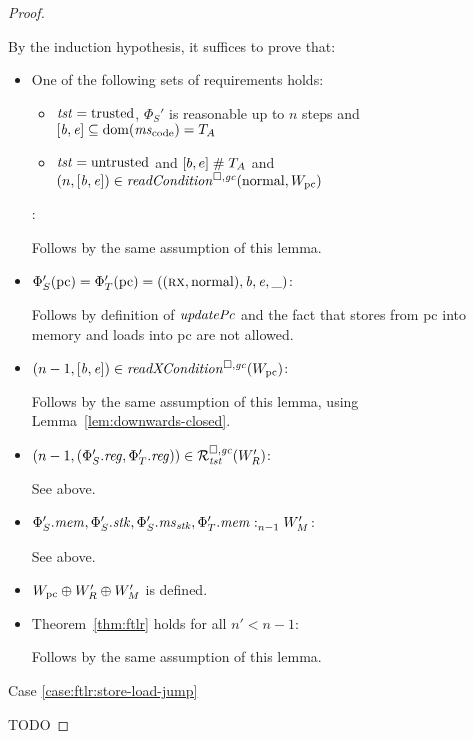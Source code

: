 \begin{proof}
\begin{itemize}
  \end{itemize}

  By the induction hypothesis, it suffices to prove that:
  \begin{itemize}
  \item One of the following sets of requirements holds:
    \begin{itemize}
    \item $\trust = \trusted$, $\Phi_S'$ is reasonable up to $n$ steps and $[\baddr,\eaddr] \subseteq \dom(\mscode) = \ta$
    \item $\trust = \untrusted$ and $[b,e] \mathrel{\#} \ta$ and $\npair{[\baddr,\eaddr]} \in \readCond{\normal,W_\pcreg}$
    \end{itemize}:

    Follows by the same assumption of this lemma.

  \item $\Phi_S'(\pcreg) = \Phi_T'(\pcreg) = ((\rx,\normal),\baddr,\eaddr,\_)$:

    Follows by definition of $\updPcAddr{}$ and the fact that stores from pc into memory and loads into pc are not allowed.

  \item $\npair[n-1]{[\baddr,\eaddr]} \in \xReadCond{W_\pcreg}$:

    Follows by the same assumption of this lemma, using Lemma~\ref{lem:downwards-closed}.

  \item $\npair[n-1]{(\Phi_S'.\reg,\Phi_T'.\reg)} \in \lrrg{\trust}(W_R')$:

    See above.

  \item $\memSat[n-1]{\Phi_S'.\mem,\Phi_S'.\stk,\Phi_S'.\ms_\stk,\Phi_T'.\mem}{W_M'}$:

    See above.

  \item $W_\pcreg \oplus W_R' \oplus W_M'$ is defined.

  \item Theorem~\ref{thm:ftlr} holds for all $n' < n-1$:

    Follows by the same assumption of this lemma.
  \end{itemize}

  Case \ref{case:ftlr:store-load-jump}

  TODO
\end{proof}

